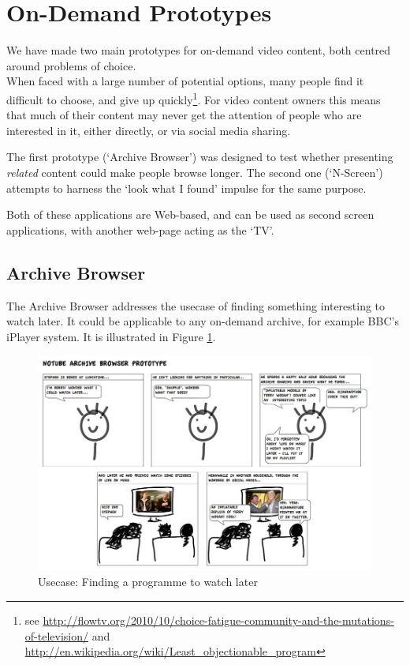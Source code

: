\documentclass{notube}
\begin{document}
\section{On-Demand Prototypes}

We have made two main prototypes for on-demand video content, both centred around problems of choice. 
\\

When faced with a large number of potential options, many people find it difficult to choose, and give up quickly\footnote{see \url{http://flowtv.org/2010/10/choice-fatigue-community-and-the-mutations-of-television/} and \url{http://en.wikipedia.org/wiki/Least_objectionable_program}}. For video content owners this means that much of their content may never get the attention of people who are interested in it, either directly, or via social media sharing.

The first prototype (`Archive Browser') was designed to test whether presenting \emph{related} content could make people browse longer. The second one (`N-Screen') attempts to harness the `look what I found' impulse for the same purpose.

Both of these applications are Web-based, and can be used as second screen applications, with another web-page acting as the `TV'.

\subsection{Archive Browser}

The Archive Browser addresses the usecase of finding something interesting to watch later. It could be applicable to any on-demand archive, for example BBC's iPlayer system. It is illustrated in Figure \ref{fig:archive}.

\begin{figure}[htbp]
\begin{center}
\includegraphics[width=6in]{images/archive.jpg}
\caption{Usecase: Finding a programme to watch later} \label{fig:archive}
\end{center}
\end{figure} 
\end{document}
